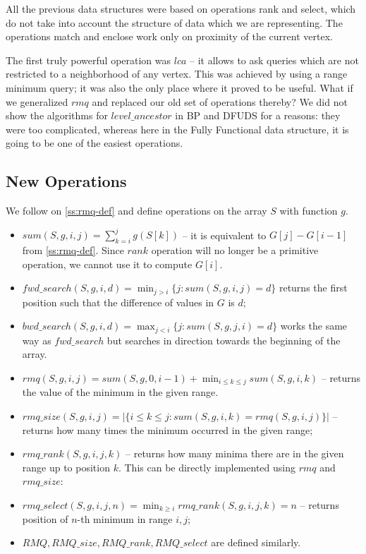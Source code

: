 All the previous data structures were based on operations rank and select, which do not take into account the structure of data which we are representing.
The operations match and enclose work only on proximity of the current vertex.

The first truly powerful operation was $lca$ -- it allows to ask queries which are not restricted to a neighborhood of any vertex.
This was achieved by using a range minimum query; it was also the only place where it proved to be useful.
What if we generalized $rmq$ and replaced our old set of operations thereby?
We did not show the algorithms for $level\_ancestor$ in BP and DFUDS for a reasons: they were too complicated, whereas here in the Fully Functional data structure, it is going to be one of the easiest operations.


\subsection{New Operations}

We follow on \ref{ss:rmq-def} and define operations on the array $S$ with function $g$.
\begin{itemize}
	\item $sum(S, g, i, j) = \sum_{k=i}^j g(S[k])$ -- it is equivalent to $G[j] - G[i - 1]$ from \ref{ss:rmq-def}.
	Since $rank$ operation will no longer be a primitive operation, we cannot use it to compute $G[i]$.

	\item $fwd\_search(S, g, i, d) = \min_{j > i} \{j : sum(S, g, i, j) = d\}$ returns the first position such that the difference of values in $G$ is $d$;
	\item $bwd\_search(S, g, i, d) = \max_{j < i} \{j : sum(S, g, j, i) = d\}$ works the same way as $fwd\_search$ but searches in direction towards the beginning of the array.
	
	\item $rmq(S, g, i, j) = sum(S, g, 0, i - 1) + \min_{i \le k \le j} sum(S, g, i, k)$ -- returns the value of the minimum in the given range.
	\item $rmq\_size(S, g, i, j) = | \{ i \le k \le j : sum(S, g, i, k) = rmq(S, g, i, j) \} | $ -- returns how many times the minimum occurred in the given range;
	\item $rmq\_rank(S, g, i, j, k)$ -- returns how many minima there are in the given range up to position $k$.
	This can be directly implemented using $rmq$ and $rmq\_size$:
\begin{algorithmic}
			\State {}
		\Else
			\State {}
		\EndIf
	\EndFunction
\end{algorithmic}
	\item $rmq\_select(S, g, i, j, n) = \min_{k \ge i} rmq\_rank(S, g, i, j, k) = n$ -- returns position of $n$-th minimum in range $i, j$;
	\item $RMQ, RMQ\_size, RMQ\_rank, RMQ\_select$ are defined similarly.
\end{itemize}

